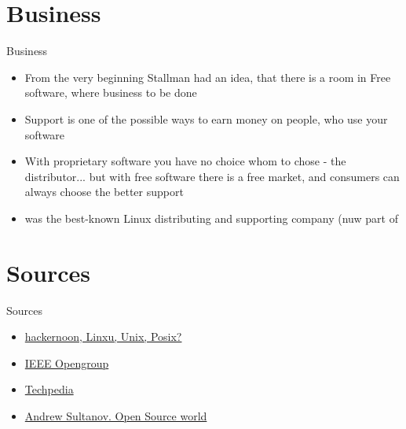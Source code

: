 \documentclass[usenames,dvipsnames,10pt,aspectratio=169]{beamer}
\begin{document}
\section{Business}
\begin{frame}{Business}
    \begin{itemize}
        \item From the very beginning Stallman had an idea, that there is a room in Free software, where business to be done
        \item Support is one of the possible ways to earn money on people, who use your software
        \item With proprietary software you have no choice whom to chose - the distributor... but with free software there is a free market, and consumers can always choose the better support
        \item {} was the best-known Linux distributing and supporting company (nuw part of 
    \end{itemize}
\end{frame}

\section{Sources}
\begin{frame}{Sources}
    \begin{itemize}
        \item \href{https://hackernoon.com/untouched-posix-5k202dwk}{hackernoon, Linxu, Unix, Posix?}
        \item \href{https://pubs.opengroup.org/onlinepubs/9699919799/}{IEEE Opengroup}
        \item \href{https://www.techopedia.com/}{Techpedia}
        \item \href{https://docs.google.com/presentation/d/e/2PACX-1vS6kqNkHhNC_wJHbxYyyQ5jEJpwHrJpLXyvGB-qbL283JTaMu5u0vgQqhqzHlXmrkcAbzTLXZ-ssrXR/pub?start=false&loop=false&delayms=3000}{Andrew Sultanov. Open Source world}
    \end{itemize}
\end{frame}
\end{document}
